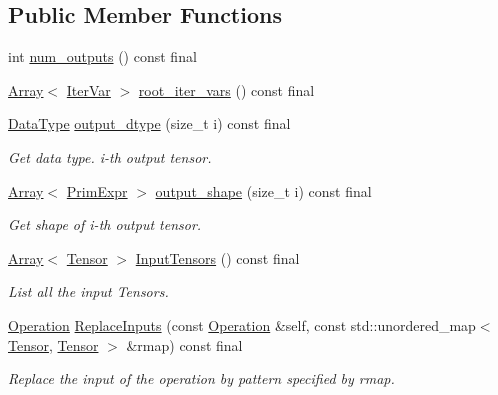 \subsection*{Public Member Functions}
\begin{DoxyCompactItemize}
\item 
int \hyperlink{classtvm_1_1te_1_1PlaceholderOpNode_a777ce9b0843eaaa37d0667b14d50059a}{num\+\_\+outputs} () const final
\item 
\hyperlink{classtvm_1_1Array}{Array}$<$ \hyperlink{classtvm_1_1tir_1_1IterVar}{Iter\+Var} $>$ \hyperlink{classtvm_1_1te_1_1PlaceholderOpNode_aed3620e14c76716f976ffec15a68f074}{root\+\_\+iter\+\_\+vars} () const final
\item 
\hyperlink{namespacetvm_a41918af1a1dc386388639a9d3ad06c5d}{Data\+Type} \hyperlink{classtvm_1_1te_1_1PlaceholderOpNode_a84d9963cba34ebe035091c15f10d3bff}{output\+\_\+dtype} (size\+\_\+t i) const final
\begin{DoxyCompactList}\small\item\em Get data type. i-\/th output tensor. \end{DoxyCompactList}\item 
\hyperlink{classtvm_1_1Array}{Array}$<$ \hyperlink{classtvm_1_1PrimExpr}{Prim\+Expr} $>$ \hyperlink{classtvm_1_1te_1_1PlaceholderOpNode_a22624cba74f79b3fa5a6ac2a4b986c79}{output\+\_\+shape} (size\+\_\+t i) const final
\begin{DoxyCompactList}\small\item\em Get shape of i-\/th output tensor. \end{DoxyCompactList}\item 
\hyperlink{classtvm_1_1Array}{Array}$<$ \hyperlink{classtvm_1_1te_1_1Tensor}{Tensor} $>$ \hyperlink{classtvm_1_1te_1_1PlaceholderOpNode_a598ce6ccf1c0c5b68263f2f6b0434b50}{Input\+Tensors} () const final
\begin{DoxyCompactList}\small\item\em List all the input Tensors. \end{DoxyCompactList}\item 
\hyperlink{classtvm_1_1te_1_1Operation}{Operation} \hyperlink{classtvm_1_1te_1_1PlaceholderOpNode_a8fe0700318a8292c45faeca6c992bc4e}{Replace\+Inputs} (const \hyperlink{classtvm_1_1te_1_1Operation}{Operation} \&self, const std\+::unordered\+\_\+map$<$ \hyperlink{classtvm_1_1te_1_1Tensor}{Tensor}, \hyperlink{classtvm_1_1te_1_1Tensor}{Tensor} $>$ \&rmap) const final
\begin{DoxyCompactList}\small\item\em Replace the input of the operation by pattern specified by rmap. \end{DoxyCompactList}\item 

\end{DoxyCompactItemize}
